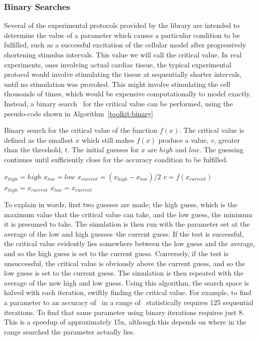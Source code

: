 \subsubsection{Binary Searches}

Several of the experimental protocols provided by the library are intended to
determine the value of a parameter which causes a particular condition to be
fulfilled, such as a successful excitation of the cellular model after
progressively shortening stimulus intervals.  This value we will call the
critical value. In real experiments, ones involving actual cardiac tissue, the
typical experimental protocol would involve stimulating the tissue at
sequentially shorter intervals, until no stimulation was provoked.  This might
involve stimulating the cell thousands of times, which would be expensive
computationally to model exactly.  Instead, a binary search~\cite{IntroAlgo} for the critical
value can be performed, using the pseudo-code shown in Algorithm~\ref{toolkit:binary}

\begin{algorithm}
\caption{
Binary search for the critical value of the function $f(x)$.
The critical value is defined as the smallest $x$ which still makes $f(x)$
produce a value, $v$, greater than the threshold, $t$.
The initial guesses for $x$ are $high$ and $low$.
The guessing continues until sufficiently close for the accuracy condition to be
fulfilled.
}
\label{toolkit:binary}
\begin{algorithmic}
\STATE $x_{high} = high$
\STATE $x_{low} = low$
\REPEAT
\STATE $x_{current} = \left(x_{high} - x_{low}\right) / 2$
\STATE $v = f\!\left(x_{current}\right)$
\STATE $x_{high} = x_{current}$
\ELSE
\STATE $x_{low} = x_{current}$
\ENDIF
{}
\end{algorithmic}
\end{algorithm}

To explain in words, first two guesses are made; the high guess, which is the
maximum value that the critical value can take, and the low guess, the minimum
it is presumed to take.  The simulation is then run with the parameter set at
the average of the low and high guesses--the current guess.  If the test is
successful, the critical value evidently lies somewhere between the low guess
and the average, and so the high guess is set to the current guess.  Conversely,
if the test is unsuccessful, the critical value is obviously above the current
guess, and so the low guess is set to the current guess.  The simulation is then
repeated with the average of the new high and low guess.  Using this algorithm,
the search space is halved with each iteration, swiftly finding the critical
value.
For example, to find a parameter to an accuracy of \ in a range of
\ statistically requires 125 sequential iterations.
To find that same parameter using binary iterations requires just 8.
This is a speedup of approximately 15x, although this depends on where in the
range searched the parameter actually lies.

